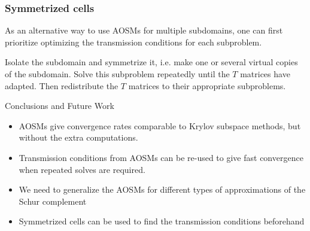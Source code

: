 \documentclass{beamer}
\begin{document}
\begin{frame}[fragile]
\frametitle{Symmetrized cells}

As an alternative way to use AOSMs for multiple subdomains,
one can first prioritize optimizing the transmission conditions for each subproblem.

Isolate the subdomain and symmetrize it, i.e. make one or several virtual copies of the subdomain.
Solve this subproblem repeatedly until the $T$ matrices have adapted.
Then redistribute the $T$ matrices to their appropriate subproblems.

\begin{figure}
	\centering
\end{figure}
\end{frame}

\begin{frame}{Conclusions and Future Work}
\begin{itemize}
\item AOSMs give convergence rates comparable to Krylov subspace methods, but without the extra computations.
\item Transmission conditions from AOSMs can be re-used to give fast convergence when repeated solves are required.
\item We need to generalize the AOSMs for different types of approximations of the Schur complement
\item Symmetrized cells can be used to find the transmission conditions beforehand
\end{itemize}
\end{frame}
\end{document}
